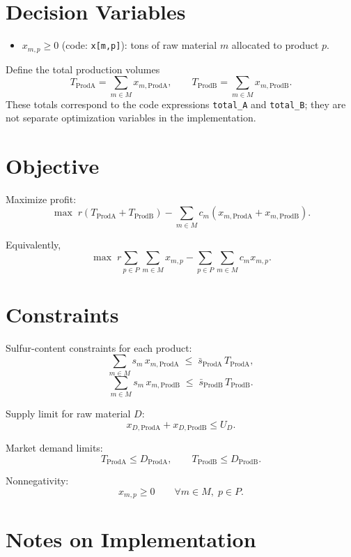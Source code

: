 \section*{Decision Variables}

\begin{itemize}
    \item $x_{m,p} \ge 0$ (code: \texttt{x[m,p]}): tons of raw material $m$ allocated to product $p$.
\end{itemize}

Define the total production volumes
\[
T_{\text{ProdA}}=\sum_{m\in M} x_{m,\text{ProdA}},
\qquad
T_{\text{ProdB}}=\sum_{m\in M} x_{m,\text{ProdB}}.
\]
These totals correspond to the code expressions \texttt{total\_A} and \texttt{total\_B}; they are not separate optimization variables in the implementation.

\section*{Objective}

Maximize profit:
\[
\max \;
r\left(T_{\text{ProdA}}+T_{\text{ProdB}}\right)
-
\sum_{m\in M} c_m\left(x_{m,\text{ProdA}}+x_{m,\text{ProdB}}\right).
\]

Equivalently,
\[
\max \;
r \sum_{p\in P}\sum_{m\in M} x_{m,p}
-
\sum_{p\in P}\sum_{m\in M} c_m x_{m,p}.
\]

\section*{Constraints}

Sulfur-content constraints for each product:
\[
\sum_{m\in M} s_m \, x_{m,\text{ProdA}}
\;\le\;
\bar{s}_{\text{ProdA}} \, T_{\text{ProdA}},
\]
\[
\sum_{m\in M} s_m \, x_{m,\text{ProdB}}
\;\le\;
\bar{s}_{\text{ProdB}} \, T_{\text{ProdB}}.
\]

Supply limit for raw material $D$:
\[
x_{D,\text{ProdA}} + x_{D,\text{ProdB}} \le U_D.
\]

Market demand limits:
\[
T_{\text{ProdA}} \le D_{\text{ProdA}},
\qquad
T_{\text{ProdB}} \le D_{\text{ProdB}}.
\]

Nonnegativity:
\[
x_{m,p} \ge 0
\qquad \forall m\in M,\; p\in P.
\]

\section*{Notes on Implementation}

